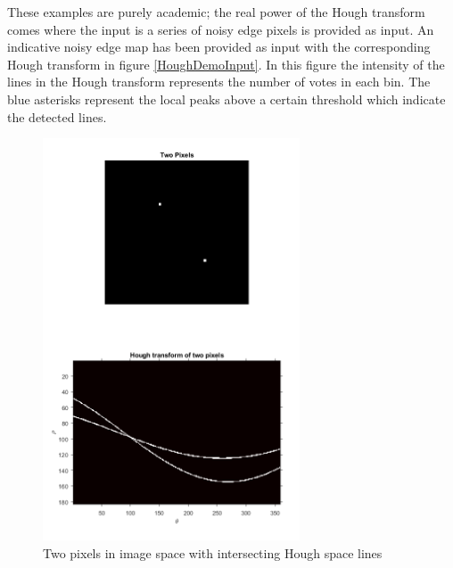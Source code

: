 \documentclass{article}
\begin{document}

	
	
	These examples are purely academic; the real power of the Hough transform comes where the input is a series of noisy edge pixels is provided as input. An indicative noisy edge map has been provided as input with the corresponding Hough transform in figure \ref{HoughDemoInput}. In this figure the intensity of the lines in the Hough transform represents the number of votes in each bin. The blue asterisks represent the local peaks above a certain threshold which indicate the detected lines.
	
	\begin{figure}
		\centering
		\includegraphics[width=3.0in]{HoughBasics2}
		\caption{Two pixels in image space with intersecting Hough space lines}
		\label{HoughBasics2}
	\end{figure}
	
\end{document}
